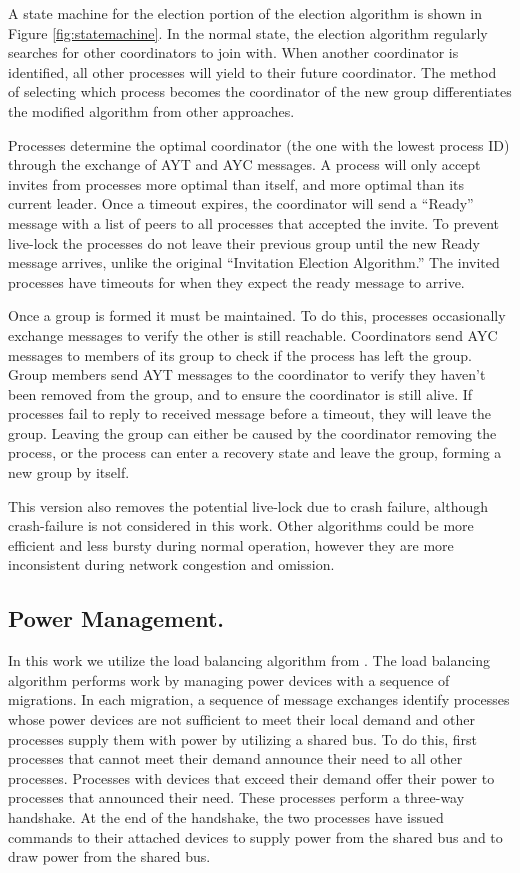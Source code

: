 A state machine for the election portion of the election algorithm is shown in Figure \ref{fig:statemachine}.
In the normal state, the election algorithm regularly searches for other coordinators to join with.
When another coordinator is identified, all other processes will yield to their future coordinator.
The method of selecting which process becomes the coordinator of the new group differentiates the modified algorithm from other approaches.

Processes determine the optimal coordinator (the one with the lowest process ID) through the exchange of \ac{AYT} and \ac{AYC} messages.
A process will only accept invites from processes more optimal than itself, and more optimal than its current leader.
Once a timeout expires, the coordinator will send a ``Ready'' message with a list of peers to all processes that accepted the invite.
To prevent live-lock the processes do not leave their previous group until the new Ready message arrives, unlike the original ``Invitation Election Algorithm.''
The invited processes have timeouts for when they expect the ready message to arrive.

Once a group is formed it must be maintained.
To do this, processes occasionally exchange messages to verify the other is still reachable.
Coordinators send \ac{AYC} messages to members of its group to check if the process has left the group.
Group members send \ac{AYT} messages to the coordinator to verify they haven't been removed from the group, and to ensure the coordinator is still alive.
If processes fail to reply to received message before a timeout, they will leave the group.
Leaving the group can either be caused by the coordinator removing the process, or the process can enter a recovery state and leave the group, forming a new group by itself.

This version also removes the potential live-lock due to crash failure, although crash-failure is not considered in this work.
Other algorithms could be more efficient and less bursty during normal operation, however they are more inconsistent during network congestion and omission.

\subsection{Power Management.}

In this work we utilize the load balancing algorithm from \cite{LOADBALANCING}.
The load balancing algorithm performs work by managing power devices with a sequence of migrations\cite{HILTESTBED}.
In each migration, a sequence of message exchanges identify processes whose power devices are not sufficient to meet their local demand and other processes supply them with power by utilizing a shared bus.
To do this, first processes that cannot meet their demand announce their need to all other processes.
Processes with devices that exceed their demand offer their power to processes that announced their need.
These processes perform a three-way handshake.
At the end of the handshake, the two processes have issued commands to their attached devices to supply power from the shared bus and to draw power from the shared bus.

